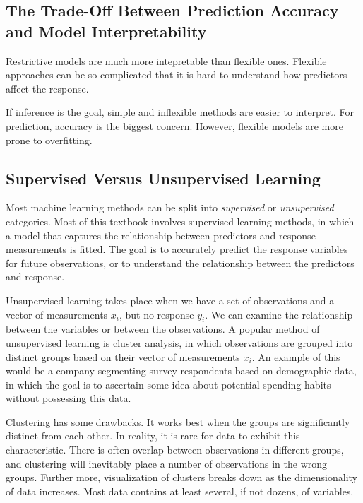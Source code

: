 \documentclass[]{book}
\theoremstyle{definition}
\theoremstyle{definition}
\theoremstyle{definition}
\theoremstyle{remark}
\begin{document}
\subsection{The Trade-Off Between Prediction Accuracy and Model
Interpretability}\label{the-trade-off-between-prediction-accuracy-and-model-interpretability}

Restrictive models are much more intepretable than flexible ones.
Flexible approaches can be so complicated that it is hard to understand
how predictors affect the response.

If inference is the goal, simple and inflexible methods are easier to
interpret. For prediction, accuracy is the biggest concern. However,
flexible models are more prone to overfitting.

\subsection{Supervised Versus Unsupervised
Learning}\label{supervised-versus-unsupervised-learning}

Most machine learning methods can be split into \emph{supervised} or
\emph{unsupervised} categories. Most of this textbook involves
supervised learning methods, in which a model that captures the
relationship between predictors and response measurements is fitted. The
goal is to accurately predict the response variables for future
observations, or to understand the relationship between the predictors
and response.

Unsupervised learning takes place when we have a set of observations and
a vector of measurements \(x_i\), but no response \(y_i\). We can
examine the relationship between the variables or between the
observations. A popular method of unsupervised learning is
\href{https://en.wikipedia.org/wiki/Cluster_analysis}{cluster analysis},
in which observations are grouped into distinct groups based on their
vector of measurements \(x_i\). An example of this would be a company
segmenting survey respondents based on demographic data, in which the
goal is to ascertain some idea about potential spending habits without
possessing this data.

Clustering has some drawbacks. It works best when the groups are
significantly distinct from each other. In reality, it is rare for data
to exhibit this characteristic. There is often overlap between
observations in different groups, and clustering will inevitably place a
number of observations in the wrong groups. Further more, visualization
of clusters breaks down as the dimensionality of data increases. Most
data contains at least several, if not dozens, of variables.
\end{document}
